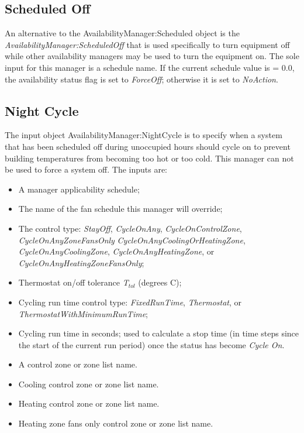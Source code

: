\subsection{Scheduled Off}\label{scheduled-off}

An alternative to the AvailabilityManager:Scheduled object is the \emph{AvailabilityManager:ScheduledOff} that is used specifically to turn equipment off while other availability managers may be used to turn the equipment on. The sole input for this manager is a schedule name. If the current schedule value is = 0.0, the availability status flag is set to \emph{ForceOff}; otherwise it is set to \emph{NoAction}.

\subsection{Night Cycle}\label{night-cycle}

The input object AvailabilityManager:NightCycle is to specify when a system that has been scheduled off during unoccupied hours should cycle on to prevent building temperatures from becoming too hot or too cold. This manager can not be used to force a system off. The inputs are:

\begin{itemize}
\item  A manager applicability schedule;

\item  The name of the fan schedule this manager will override;

\item  The control type: \emph{StayOff}, \emph{CycleOnAny}, \emph{CycleOnControlZone}, \emph{CycleOnAnyZoneFansOnly} \emph{CycleOnAnyCoolingOrHeatingZone}, \emph{CycleOnAnyCoolingZone}, \emph{CycleOnAnyHeatingZone}, or \emph{CycleOnAnyHeatingZoneFansOnly};

\item  Thermostat on/off tolerance \emph{T\(_{tol}\)} (degrees C);

\item  Cycling run time control type: \emph{FixedRunTime}, \emph{Thermostat}, or \emph{ThermostatWithMinimumRunTime};

\item  Cycling run time in seconds; used to calculate a stop time (in time steps since the start of the current run period) once the status has become \emph{Cycle On}.

\item  A control zone or zone list name.

\item  Cooling control zone or zone list name.

\item  Heating control zone or zone list name.

\item  Heating zone fans only control zone or zone list name.

\end{itemize}


